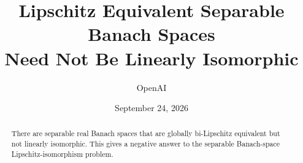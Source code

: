 \documentclass[11pt]{article}
\title{Lipschitz Equivalent Separable Banach Spaces\\
Need Not Be Linearly Isomorphic}
\author{OpenAI}
\date{September 24, 2026}
\theoremstyle{definition}
\theoremstyle{remark}
\numberwithin{equation}{section}
\begin{document}
\maketitle
\begin{abstract}
There are separable real Banach spaces that are globally bi-Lipschitz
equivalent but not linearly isomorphic. This gives a negative answer
to the separable Banach-space Lipschitz-isomorphism problem.
\end{abstract}










\end{document}
